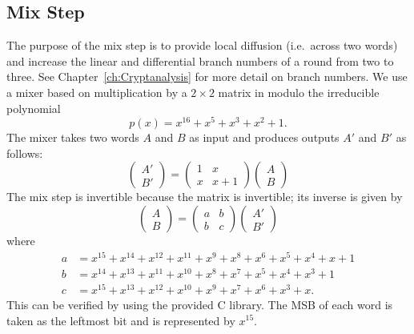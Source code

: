 \subsection{Mix Step}
The purpose of the mix step is to provide local diffusion (i.e.\ across two words) and increase the linear and differential branch numbers of a round from two to three.
See Chapter~\ref{ch:Cryptanalysis} for more detail on branch numbers.
We use a mixer based on multiplication by a $2 \times 2$ matrix in \gfsixteen modulo the irreducible polynomial
\begin{equation*}
p(x) = x^{16} + x^5 + x^3 + x^2 + 1.
\end{equation*}
The mixer takes two words $A$ and $B$ as input and produces outputs $A'$ and $B'$ as follows:
\begin{equation*}
\begin{pmatrix}
A' \\ B'
\end{pmatrix}
=
\begin{pmatrix}
1 & x \\ x & x + 1
\end{pmatrix}
\begin{pmatrix}
A \\ B
\end{pmatrix}
\end{equation*}
The mix step is invertible because the matrix is invertible; its inverse is given by
\begin{equation*}
\begin{pmatrix}
A \\ B
\end{pmatrix}
=
\begin{pmatrix}
a & b \\ b & c
\end{pmatrix}
\begin{pmatrix}
A' \\ B'
\end{pmatrix}
\end{equation*}
where
\begin{align*}
a &= x^{15} + x^{14} + x^{12} + x^{11} + x^9 + x^8 + x^6 + x^5 + x^4 + x + 1 \\
b &= x^{14} + x^{13} + x^{11} + x^{10} + x^8 + x^7 + x^5 + x^4 + x^3 + 1 \\
c &= x^{15} + x^{13} + x^{12} + x^{10} + x^9 + x^7 + x^6 + x^3 + x.
\end{align*}
This can be verified by using the provided \gfsixteen C library.
The MSB of each word is taken as the leftmost bit and is represented by $x^{15}$. 

